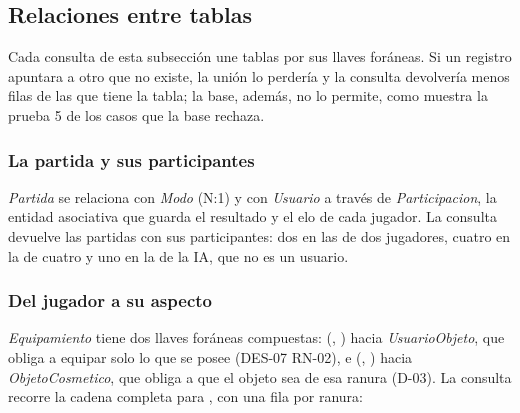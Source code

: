 \subsection*{Relaciones entre tablas}

Cada consulta de esta subsección une tablas por sus llaves foráneas. Si un registro apuntara a otro que no existe, la unión lo perdería y la consulta devolvería menos filas de las que tiene la tabla; la base, además, no lo permite, como muestra la prueba 5 de los casos que la base rechaza.

\subsubsection*{La partida y sus participantes}

\textit{Partida} se relaciona con \textit{Modo} (N:1) y con \textit{Usuario} a través de \textit{Participacion}, la entidad asociativa que guarda el resultado y el elo de cada jugador. La consulta devuelve las \dpNumPartidas{} partidas con sus participantes: dos en las de dos jugadores, cuatro en la de cuatro y uno en la de la IA, que no es un usuario.




\subsubsection*{Del jugador a su aspecto}

\textit{Equipamiento} tiene dos llaves foráneas compuestas: (, ) hacia \textit{UsuarioObjeto}, que obliga a equipar solo lo que se posee (\mbox{DES-07} \mbox{RN-02}), e (, ) hacia \textit{ObjetoCosmetico}, que obliga a que el objeto sea de esa ranura (\mbox{D-03}). La consulta recorre la cadena completa para , con una fila por ranura:



